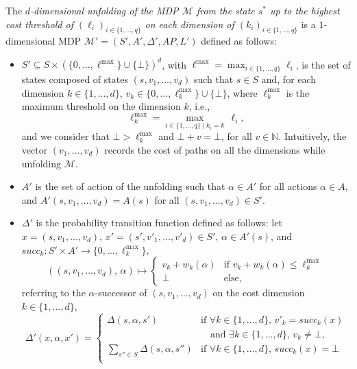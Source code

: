 \begin{definition}
The \textit{$d$-dimensional unfolding of the MDP $\mathcal{M}$ from the state $s^*$
up to the highest cost threshold of $(\ell_i)_{i \in \{1, \dots, q\}}$ on each dimension of $(k_i)_{i \in \{1, \dots, q\}}$} is a $1$-dimensional MDP \sloppy $\mathcal{M}' = {(S', A', \Delta', AP, L')}$ defined as follows:
  \begin{itemize}
    \item $S' \subseteq S \times (\{ 0, \dots, \ell^{\max} \} \cup \{\bot\})^d$, with $\ell^{\max} = \max_{i \in \{1, \dots, q\}}\ell_i$,  is the set of states composed of states $(s, v_1, \dots, v_d)$ such that $s \in S$ and, for each dimension $k \in \{1, \dots, d\}$, $v_k \in \{0, \dots, \ell^{\max}_k\} \cup \{\bot\}$, where $\ell^{\max}_k$ is the maximum threshold on the dimension $k$, i.e., \[\ell^{\max}_k = \max_{i \in \{1, \dots, q\} \; | \; k_i = k }  \, \ell_i,\]
    and we consider that $\bot > \ell_k^{\max}$
    and $\bot + v = \bot$, for all $v \in \mathbb{N}$.
    Intuitively, the vector $(v_1, \dots, v_d)$ records the cost of paths on all the dimensions while unfolding $\mathcal{M}$.
    \item $A'$ is the set of action of the unfolding such that $\alpha \in A'$
    for all actions $\alpha \in A$, and
    $A'(s, v_1, \dots, v_d) = A(s)$
    for all $(s, v_1, \dots, v_d) \in S'$.
    \item $\Delta'$ is the probability transition function defined as follows: let $x = (s, v_1, \dots, v_d) , \, x'=(s', v'_1, \dots, v'_d) \in S'$, $\alpha \in A'(s)$,
    and
    $succ_k: S' \times A' \rightarrow \{0, \dots, \ell^{\max}_k\},$
    \[((s, v_1, \dots, v_d), \, \alpha) \mapsto \begin{cases}
      v_k + w_k(\alpha) & \text{if } v_k + w_k(\alpha) \leq \ell^{\max}_k \\
      \bot & \text{else},
    \end{cases}\]
    referring to the $\alpha$-successor of $(s, v_1, \dots, v_d)$ on the cost dimension $k \in \{1, \dots, d\}$,
    \[
    \Delta'(x, \alpha, x') = \begin{cases}
      \Delta(s, \alpha, s') & \text{if } \forall k \in \{1, \dots, d\}, \, v'_k = succ_k(x) \\
      & \quad \text{and }\exists k \in \{1, \dots, d\}, \, v_k \neq \bot, \\
      \sum_{s'' \in S} \Delta(s, \alpha, s'')
      & \text{if } \forall k \in \{1, \dots, d\},\, succ_k(x) = \bot \\

\end{cases}\]
\end{itemize}
\end{definition}
